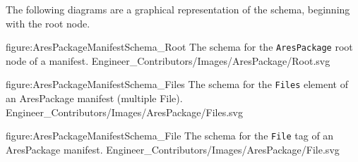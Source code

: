The following diagrams are a graphical representation of the schema, beginning with the root node.

\FullPageDiagram
    {figure:AresPackageManifestSchema_Root}
    {The schema for the {\tt AresPackage} root node of a manifest.}
    {Engineer_Contributors/Images/AresPackage/Root.svg}

\FullPageDiagram
    {figure:AresPackageManifestSchema_Files}
    {The schema for the {\tt Files} element of an AresPackage manifest (multiple File).}
    {Engineer_Contributors/Images/AresPackage/Files.svg}

\FullPageDiagram
    {figure:AresPackageManifestSchema_File}
    {The schema for the {\tt File} tag of an AresPackage manifest.}
    {Engineer_Contributors/Images/AresPackage/File.svg}

